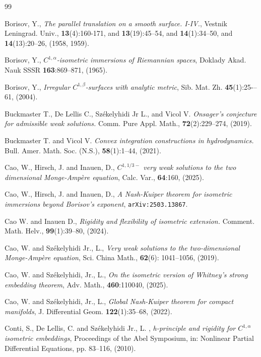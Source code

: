 \documentclass[reqno,twoside,11pt]{amsart}
\numberwithin{equation}{section}
\theoremstyle{plain}
\theoremstyle{definition}
\begin{document}
\begin{thebibliography}{99}

 {\sc Borisov, Y.}, {\em The parallel translation on a
    smooth surface. I-IV.}, Vestnik Leningrad. Univ., {\bf
    13}(4):160-171, and {\bf 13}(19):45--54, and {\bf 14}(1):34--50,
and {\bf 14}(13):20--26, (1958, 1959).

 {\sc Borisov, Y.}, {\em $C^{1,\alpha}$-isometric immersions of Riemannian
spaces}, Doklady Akad. Nauk SSSR {\bf 163}:869--871, (1965).

 {\sc Borisov, Y.}, {\em Irregular
    $C^{1,\beta}$-surfaces with analytic metric}, Sib. Mat. Zh. {\bf
    45}(1):25-–61, (2004).

 {\sc Buckmaster T., De Lellis C., Sz\'ekelyhidi Jr L., and Vicol V.}
{\em Onsager’s conjecture for admissible weak solutions.}
Comm. Pure Appl. Math., {\bf 72}(2):229--274, (2019).

 {\sc Buckmaster T. and Vicol V.}
{\em Convex integration constructions in hydrodynamics.}
Bull. Amer. Math. Soc. (N.S.), {\bf 58}(1):1--44, (2021).

 {\sc Cao, W., Hirsch, J. and Inauen, D.}, 
{\em $C^{1,1/3-}$ very weak solutions to the two dimensional
  Monge-Amp\`ere equation},  Calc. Var., {\bf 64}:160, (2025).

 {\sc Cao, W., Hirsch, J. and Inauen, D.}, 
{\em A Nash-Kuiper theorem for isometric immersions beyond Borisov's
  exponent}, {\tt arXiv:2503.13867}.

 {\sc Cao W. and Inauen D.}, 
{\em Rigidity and flexibility of isometric extension.}
Comment. Math. Helv., {\bf 99}(1):39--80, (2024).

 {\sc Cao, W. and Sz\'ekelyhidi Jr., L.}, {\em Very weak
    solutions to the two-dimensional Monge-Amp\`ere equation}, 
  Sci. China Math., {\bf 62}(6): 1041--1056, (2019).

  {\sc Cao, W.  and Sz\'{e}kelyhidi, Jr., L.},
{\em On the isometric version of Whitney's strong embedding theorem},
Adv. Math., {\bf 460}:110040, (2025).

 {\sc Cao, W. and Sz\'{e}kelyhidi, Jr., L.},
{\em Global {N}ash-{K}uiper theorem for compact manifolds},
J. Differential Geom. {\bf 122}(1):35--68, (2022).

 {\sc Conti, S., De Lellis, C. and Sz\'ekelyhidi Jr.,
    L. }, {\em h-principle and rigidity for $C^{1,\alpha}$ isometric embeddings},
Proceedings of the Abel Symposium, in: Nonlinear Partial Differential
Equations, pp. 83--116, (2010).


\end{thebibliography}
\end{document}
